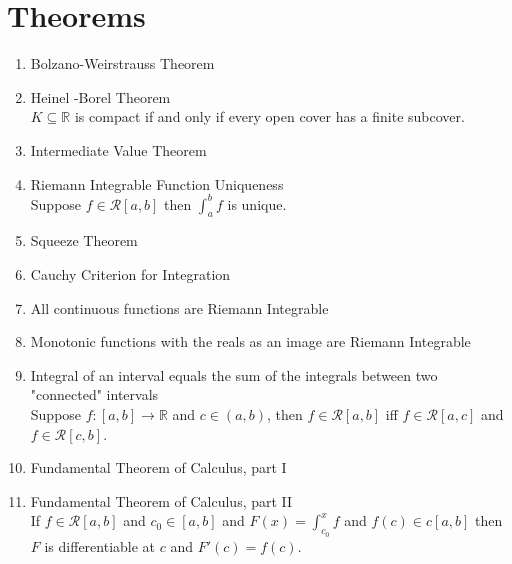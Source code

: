 \documentclass{article}
\newcommand{\reals}{{\mathbb R}}
\newcommand{\scriptR}{\mathcal{R}}
\begin{document}
\section{Theorems}
\begin{enumerate}
\item Bolzano-Weirstrauss Theorem \label{BWT}\hfill \\

\item Heinel -Borel Theorem \label{HBT}\hfill \\

$K\subseteq \reals$ is compact if and only if every open cover has a finite subcover.

\item Intermediate Value Theorem \label{IVT}\hfill \\

\item Riemann Integrable Function Uniqueness \label{RIFU}\hfill \\
Suppose $f\in \scriptR[a,b]$ then $\displaystyle{\int_a^b}f$ is unique.

\item Squeeze Theorem \label{Squeeze}\hfill \\

\item Cauchy Criterion for Integration  \label{CauchyCritInt}\hfill \\

\item All continuous functions are Riemann Integrable \label{continuousEqR}\hfill \\

\item Monotonic functions with the reals as an image are Riemann Integrable \label{monotonicEqR}\hfill \\

\item Integral of an interval equals the sum of the integrals between two "connected" intervals\hfill \\
        Suppose \(f:[a,b]\to\reals\) and \(c\in(a,b)\), then \(f\in\scriptR[a,b]\) iff \(f\in\scriptR[a,c]\) and \(f\in\scriptR[c,b]\).

\item Fundamental Theorem of Calculus, part I\label{FTC1}\hfill \\

\item Fundamental Theorem of Calculus, part II\label{FTC2}\hfill \\
If $f\in \scriptR[a,b]$ and $c_0\in[a,b]$ and $F(x)=\displaystyle{\int_{c_0}^x f}$ and $f(c)\in c[a,b]$ then $F$ is differentiable at $c$ and $F'(c)=f(c)$.


\end{enumerate}
\end{document}
